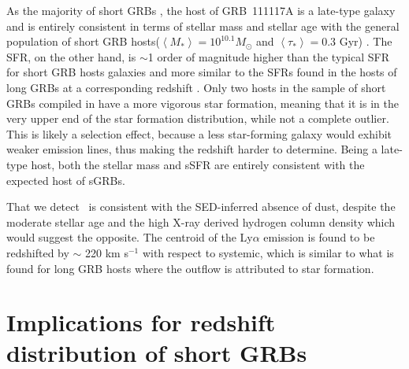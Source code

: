 \documentclass{aa}    %
\begin{document}
As the majority of short GRBs \citep{Fong2013b}, the host of GRB~111117A is a
late-type galaxy and is entirely consistent in terms of stellar mass and stellar
age with the general population of short GRB hosts($\left\langle M _*
\right\rangle = 10^{10.1} M_{\odot}$ and $\left\langle \tau _* \right\rangle =
0.3 $ Gyr) \citet{Leibler2010}. The SFR, on the other hand, is $\sim$1 order of
magnitude higher than the typical SFR for short GRB hosts galaxies
\citep{Berger2014} and more similar to the SFRs found in the hosts of long GRBs
at a corresponding redshift \citep{Kruhler2015}. Only two hosts in the sample of
short GRBs compiled in \citet{Berger2014} have a more vigorous star formation,
meaning that it is in the very upper end of the star formation distribution,
while not a complete outlier. This is likely a selection effect, because a less
star-forming galaxy would exhibit weaker emission lines, thus making the
redshift harder to determine. Being a late-type host, both the stellar mass and
sSFR are entirely consistent with the expected host of
sGRBs\citep{Behroozi2014}.

That we detect \lya~is consistent with the SED-inferred absence of dust, despite
the moderate stellar age and the high X-ray derived hydrogen column density
which would suggest the opposite. The centroid of the Ly$\alpha$ emission is
found to be redshifted by $\sim$ 220 km s$^{-1}$ with respect to systemic, which
is similar to what is found for long GRB hosts \citep{Milvang-Jensen2012a} where
the outflow is attributed to star formation.




\section{Implications for redshift distribution of short GRBs}
\end{document}
